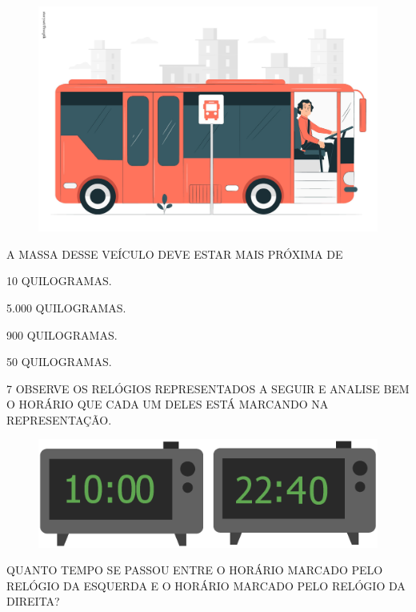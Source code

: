 \begin{figure}[H]
\centering
\includegraphics[width=\textwidth]{./media/SAEB_1ANO_MAT_FIGURA138.png}
\end{figure}

A MASSA DESSE VEÍCULO DEVE ESTAR MAIS PRÓXIMA DE

\begin{escolha}[itemsep=0pt]
\item 10 QUILOGRAMAS.

\item 5.000 QUILOGRAMAS.

\item 900 QUILOGRAMAS.

\item 50 QUILOGRAMAS.
\end{escolha}


\num{7} OBSERVE OS RELÓGIOS REPRESENTADOS A SEGUIR E ANALISE BEM O HORÁRIO QUE CADA UM DELES ESTÁ MARCANDO NA REPRESENTAÇÃO.

\begin{figure}[H]
\centering
\includegraphics[width=\textwidth]{./media/SAEB_1ANO_MAT_FIGURA139.png}
\end{figure}

QUANTO TEMPO SE PASSOU ENTRE O HORÁRIO MARCADO PELO RELÓGIO DA ESQUERDA E O HORÁRIO MARCADO PELO RELÓGIO DA DIREITA?

